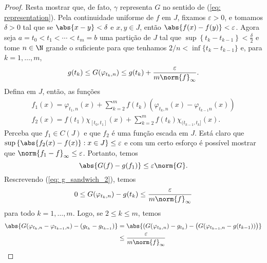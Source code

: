 \begin{proof}
    Resta mostrar que, de fato, \( \gamma \) representa \( G \) no sentido de (\ref{eq: representation}).
    Pela continuidade uniforme de \( f \) em \( J \), fixamos \( \varepsilon > 0 \), e tomamos \( \delta > 0 \) tal que se \( \abs{ x - y } < \delta \) e \( x, y \in J \), então \( \abs{ f(x) - f(y) } < \varepsilon \).
    Agora seja \( a = t_{ 0 } < t_{ 1 } < \cdots < t_{ m } = b \) uma partição de \( J \) tal que \( \sup \left\{ t_{ k } - t_{ k-1 } \right\} < \frac{ \delta }{ 2 } \) e tome \( n \in \N \) grande o suficiente para que tenhamos \( 2/n < \inf \{t_{ k } - t_{ k-1 }\} \) e, para \( k = 1, \dots, m \),
    \begin{equation}
        g(t_{ k }) \leq G(\varphi_{ t_{ k }, n }) \leq g(t_{ k }) + \frac{ \varepsilon }{ m \norm{ f }_{ \infty } }
        \label{eq: g_sandwich_2}
    .\end{equation}
    Defina em \( J \), então, as funções
    \begin{align*}
        f_{ 1 }(x)
        = \varphi_{ t_{ 1 }, n }(x) + \sum_{ k=2 }^{ m } f(t_{ k }) \left(
            \varphi_{ t_{ k }, n }(x) - \varphi_{ t_{ k-1 }n }(x)
        \right) \\
        f_{ 2 }(x)
        = f(t_{ 1 }) \chi_{ [t_{ 0 }, t_{ 1 }] }(x) +
        \sum_{ k=2 }^{ m } f(t_{ k }) \chi_{ (t_{ k-1 }, t_{ k }] }(x)
    .\end{align*}
    Perceba que \( f_{ 1 } \in C(J) \) e que \( f_{ 2 } \) é uma função escada em \( J \).
    Está claro que \( \sup \left\{ \abs{ f_{ 2 }(x) - f(x) } : x \in J \right\} \leq \varepsilon \) e com um certo esforço é possível mostrar que \( \norm{ f_{ 1 } - f }_{ \infty } \leq \varepsilon \).
    Portanto, temos
    \begin{equation}
        \abs{ G(f) - g(f_{ 1 }) } \leq \varepsilon \norm{ G }
        \label{eq: triangle_1}
    .\end{equation}
    Rescrevendo (\ref{eq: g_sandwich_2}), temos \[
        0 \leq G(\varphi_{ t_{ k }, n }) - g(t_{ k }) \leq \frac{ \varepsilon }{ m \norm{ f }_{ \infty } }
    \]
    para todo \( k = 1, \dots, m \).
    Logo, se \( 2 \leq k \leq m \), temos
    \begin{align*}
        \abs{ G(\varphi_{ t_{ k }, n } - \varphi_{ t_{ k-1 }, n }) - (g_{ t_{ k } } - g_{ t_{ k-1 } })}
        &= \abs{ \left(
            G(\varphi_{ t_{ k }, n }) - g_{ t_{ k } }
        \right) -
        \left(
            G(\varphi_{ t_{ k-1 }, n } - g(t_{ k-1 }))
        \right)} \\
        &\leq \frac{ \varepsilon }{ m \norm{ f }_{ \infty } }

\end{align*}
\end{proof}
